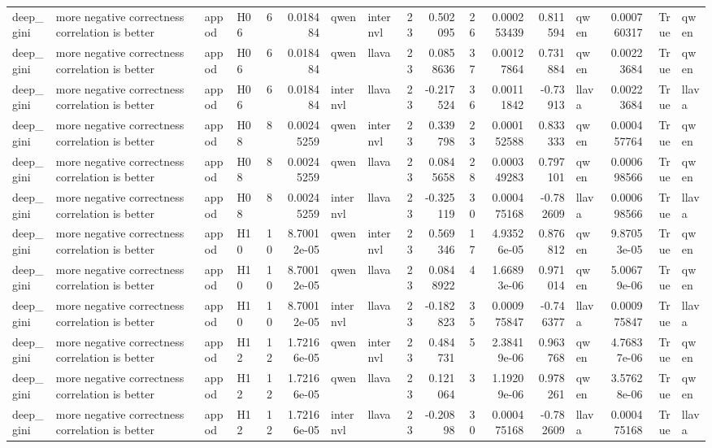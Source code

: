 \begin{longtable}{llllrrllrrrrrlrrl}
deep\_gini & more negative correctness correlation is better & appod & H06 & 6 & 0.018484 & qwen & internvl & 23 & 0.502095 & 26 & 0.000253439 & 0.811594 & qwen & 0.000760317 & True & qwen \\
deep\_gini & more negative correctness correlation is better & appod & H06 & 6 & 0.018484 & qwen & llava & 23 & 0.0858636 & 37 & 0.00127864 & 0.731884 & qwen & 0.00223684 & True & qwen \\
deep\_gini & more negative correctness correlation is better & appod & H06 & 6 & 0.018484 & internvl & llava & 23 & -0.217524 & 36 & 0.00111842 & -0.73913 & llava & 0.00223684 & True & llava \\
deep\_gini & more negative correctness correlation is better & appod & H08 & 8 & 0.00245259 & qwen & internvl & 23 & 0.339798 & 23 & 0.000152588 & 0.833333 & qwen & 0.000457764 & True & qwen \\
deep\_gini & more negative correctness correlation is better & appod & H08 & 8 & 0.00245259 & qwen & llava & 23 & 0.0845658 & 28 & 0.000349283 & 0.797101 & qwen & 0.000698566 & True & qwen \\
deep\_gini & more negative correctness correlation is better & appod & H08 & 8 & 0.00245259 & internvl & llava & 23 & -0.325119 & 30 & 0.000475168 & -0.782609 & llava & 0.000698566 & True & llava \\
deep\_gini & more negative correctness correlation is better & appod & H10 & 10 & 8.70012e-05 & qwen & internvl & 23 & 0.569346 & 17 & 4.93526e-05 & 0.876812 & qwen & 9.87053e-05 & True & qwen \\
deep\_gini & more negative correctness correlation is better & appod & H10 & 10 & 8.70012e-05 & qwen & llava & 23 & 0.0848922 & 4 & 1.66893e-06 & 0.971014 & qwen & 5.00679e-06 & True & qwen \\
deep\_gini & more negative correctness correlation is better & appod & H10 & 10 & 8.70012e-05 & internvl & llava & 23 & -0.182823 & 35 & 0.000975847 & -0.746377 & llava & 0.000975847 & True & llava \\
deep\_gini & more negative correctness correlation is better & appod & H12 & 12 & 1.72166e-05 & qwen & internvl & 23 & 0.484731 & 5 & 2.38419e-06 & 0.963768 & qwen & 4.76837e-06 & True & qwen \\
deep\_gini & more negative correctness correlation is better & appod & H12 & 12 & 1.72166e-05 & qwen & llava & 23 & 0.121064 & 3 & 1.19209e-06 & 0.978261 & qwen & 3.57628e-06 & True & qwen \\
deep\_gini & more negative correctness correlation is better & appod & H12 & 12 & 1.72166e-05 & internvl & llava & 23 & -0.20898 & 30 & 0.000475168 & -0.782609 & llava & 0.000475168 & True & llava \\

\end{longtable}
